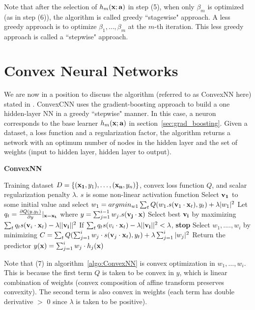 \documentclass{article}
\begin{document}
Note that after the selection of $h_m({\bf x; a})$ in step (5), when only $\beta_m$ is optimized (as in step (6)), the algorithm is called greedy ``stagewise" approach. A less greedy approach is to optimize $\beta_1, \dots, \beta_m$ at the $m$-th iteration. This less greedy approach is called a ``stepwise" approach.   

\newpage
\section{Convex Neural Networks}

We are now in a position to discuss the algorithm (referred to as ConvexNN here) stated in \cite{bengio2005convex}. ConvexCNN uses the gradient-boosting approach to build a one hidden-layer NN in a greedy ``stepwise" manner. In this case, a neuron corresponds to the base learner $h_m({\bf x; a})$ in section~\ref{sec:grad_boosting}. Given a dataset, a loss function and a regularization factor, the algorithm returns a network with an optimum number of nodes in the hidden layer and the set of weights (input to hidden layer, hidden layer to output).

\begin{algorithm}
\caption{{\bf ConvexNN}}\label{algo:ConvexNN}
\begin{algorithmic}[1]
 Training dataset $D = \{({\bf x_1}, y_1), \dots, ({\bf x_n}, y_n)\}$, convex loss function $Q$, and scalar regularization penalty $\lambda$. $s$ is some non-linear activation function 
\STATE Select ${\bf v_1}$ to some initial value and select $w_1 = argmin_{w1} \sum_t Q(w_1.s({\bf v}_1 \cdot {\bf x}_t), y_t) + \lambda |w_1|^2$
\STATE Let $q_t = \frac{\partial Q(y, y_t)}{\partial y}|_{\bf x = x_t}$ where $y = \sum_{j = 1}^{i - 1} w_j . s({\bf v_j} \cdot \bf{x})$
\STATE Select best ${\bf v_i}$ by maximizing $\sum_{t} q_t s({\bf v}_i \cdot {\bf x}_t) - \lambda ||{\bf v_i}||^2$ 
\STATE If $\sum_{t} q_t s(v_i \cdot {\bf x}_t) - \lambda ||{\bf v_i}||^2 < \lambda$, {\bf stop}
\STATE Select $w_1, ...., w_i$ by minimizing $C =  \sum_t Q(\sum_{j = 1}^{i} w_j \cdot s({\bf v}_j \cdot {\bf x}_t), y_t) + \lambda \sum_{j = 1}^{i}|w_j|^2$
\ENDFOR
\STATE Return the predictor $y({\bf x}) = \sum_{j = 1}^{i} w_j \cdot h_j({\bf x})$ 
\end{algorithmic}
\end{algorithm}

Note that (7) in algorithm~\ref{algo:ConvexNN} is convex optimization in $w_1, \dots, w_i$. This is because the first term $Q$ is taken to be convex in $y$, which is linear combination of weights (convex composition of affine transform preserves convexity). The second term is also convex in weights (each term has double derivative $>$ 0 since $\lambda$ is taken to be positive).
\end{document}
